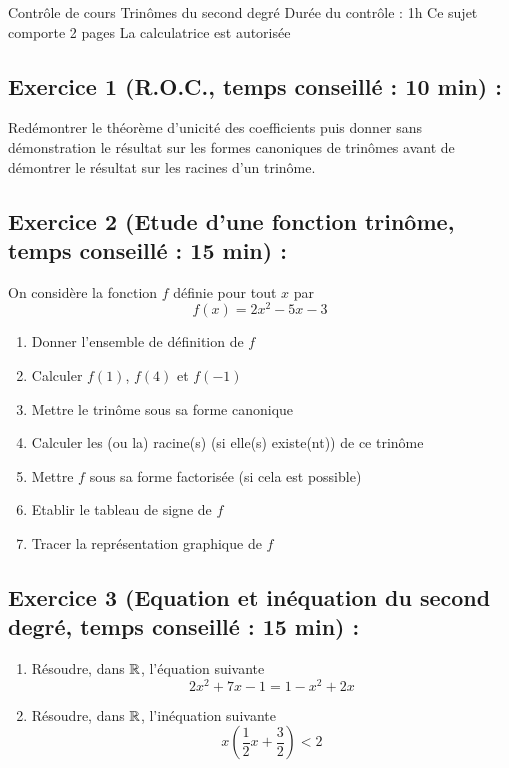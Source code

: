 


\center
\Large Contrôle de cours
\flushleft
\center
Trinômes du second degré 
\flushleft \normalsize
Durée du contrôle : 1h\newline
Ce sujet comporte 2 pages\newline
La calculatrice est autorisée
\subsection*{Exercice 1 (R.O.C., temps conseillé : 10 min) : }
Redémontrer le théorème d'unicité des coefficients puis donner sans démonstration le résultat sur les formes canoniques de trinômes avant de démontrer le résultat sur les racines d'un trinôme.
\subsection*{Exercice 2 (Etude d'une fonction trinôme, temps conseillé : 15 min) : }
On considère la fonction $f$ définie pour tout $x$ par $$f(x) = 2x^2-5x-3$$
\begin{enumerate}
\item Donner l'ensemble de définition de $f$
\item Calculer $f(1)$, $f(4)$ et $f(-1)$
\item Mettre le trinôme sous sa forme canonique
\item Calculer les (ou la) racine(s) (si elle(s) existe(nt)) de ce trinôme
\item Mettre $f$ sous sa forme factorisée (si cela est possible)
\item Etablir le tableau de signe de $f$
\item Tracer la représentation graphique de $f$
\end{enumerate}
\subsection*{Exercice 3 (Equation et inéquation du second degré, temps conseillé : 15 min) : }
\begin{enumerate}
\item Résoudre, dans $\mathbb{R}$, l'équation suivante
$$2x^2 + 7 x -1 = 1 - x^2 + 2x$$
\item Résoudre, dans $\mathbb{R}$, l'inéquation suivante
$$x\left(\frac{1}{2}x + \frac{3}{2}\right) < 2$$
\end{enumerate}
